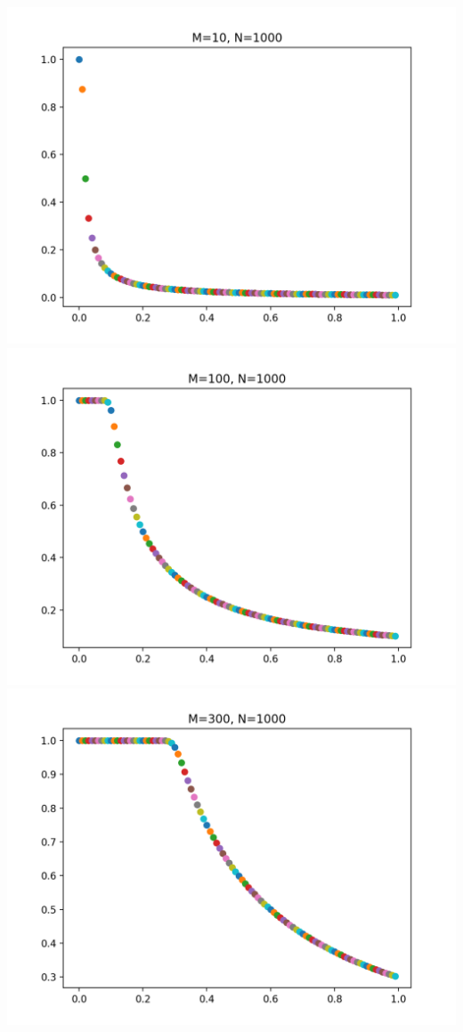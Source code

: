 \includegraphics[scale=0.5]{img/1000_10}
\includegraphics[scale=0.5]{img/1000_100}
\includegraphics[scale=0.5]{img/1000_300}
